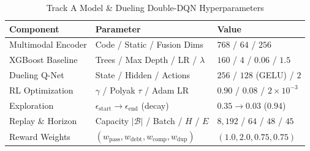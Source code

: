 \documentclass[conference]{IEEEtran}
\begin{document}
\begin{table}[t]
\centering
\caption{Track A Model \& Dueling Double-DQN Hyperparameters}
\label{tab:hyperparams}
\setlength{\tabcolsep}{5pt}
\renewcommand{\arraystretch}{1.12}
\begin{tabular}{@{}lll@{}}
\toprule
\textbf{Component} & \textbf{Parameter} & \textbf{Value} \\
\midrule
Multimodal Encoder & Code / Static / Fusion Dims & $768$ / $64$ / $256$ \\
XGBoost Baseline & Trees / Max Depth / LR / $\lambda$ & $160$ / $4$ / $0.06$ / $1.5$ \\
Dueling Q-Net & State / Hidden / Actions & $256$ / $128$ (GELU) / $2$ \\
RL Optimization & $\gamma$ / Polyak $\tau$ / Adam LR & $0.90$ / $0.08$ / $2\times 10^{-3}$ \\
Exploration & $\epsilon_{\text{start}} \to \epsilon_{\text{end}}$ (decay) & $0.35 \to 0.03$ ($0.94$) \\
Replay \& Horizon & Capacity $|\mathcal{B}|$ / Batch / $H$ / $E$ & $8{,}192$ / $64$ / $48$ / $45$ \\
Reward Weights & $(w_{\text{pass}}, w_{\text{debt}}, w_{\text{comp}}, w_{\text{dup}})$ & $(1.0, 2.0, 0.75, 0.75)$ \\
\bottomrule
\end{tabular}
\end{table}
\end{document}
